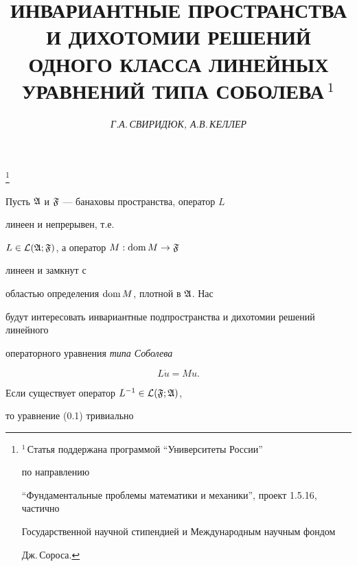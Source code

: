 \author{\it Г.А.\,СВИРИДЮК, А.В.\,КЕЛЛЕР} 


\title{ИНВАРИАНТНЫЕ ПРОСТРАНСТВА И ДИХОТОМИИ РЕШЕНИЙ\\ 


ОДНОГО КЛАССА ЛИНЕЙНЫХ УРАВНЕНИЙ ТИПА СОБОЛЕВА$\,{}^1$} 


 


\thanks{${}^1\,$Статья поддержана программой ``Университеты России''


по направлению 


``Фундаментальные проблемы математики и механики'', проект 1.5.16, частично 


Государственной научной стипендией и Международным научным фондом 


Дж.\,Сороса.} 


 


\date{} 


\pagestyle{plain} 


 


 


\maketitle 


 


 


Пусть $\frak A$ и $\frak F$ --- банаховы пространства, оператор $L$


линеен и непрерывен, т.е. 


$L\in\cal L(\frak A;\frak F)$, а оператор $M:\operatorname{dom} M\to \frak F$ 


линеен и замкнут с 


областью определения $\operatorname{dom} M$, плотной в $\frak A$. Нас 


будут интересовать инвариантные подпространства и дихотомии решений линейного 


операторного уравнения {\it типа Соболева} \cite{Sv1} 


\begin{equation*} 


L\Dot u=Mu.\tag{0.1} 


\end{equation*} 


Если существует оператор $L^{-1}\in\cal L(\frak F;\frak A)$, 


то уравнение (0.1) тривиально 


